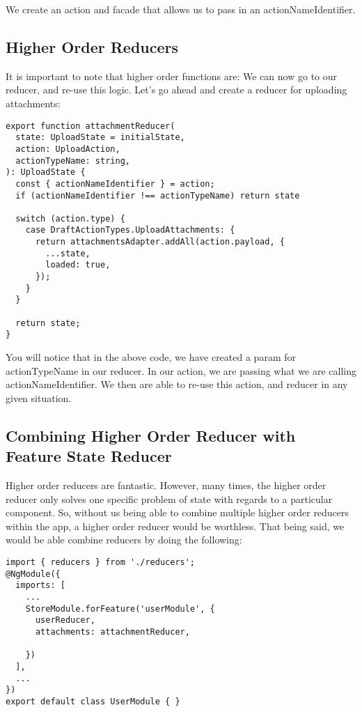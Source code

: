 We create an action and facade that allows us to pass in an
actionNameIdentifier.

\subsection{Higher Order Reducers}

It is important to note that higher order functions are:
We can now go to our reducer, and re-use this logic. Let's
go ahead and create a reducer for uploading attachments:

\begin{lstlisting}
export function attachmentReducer(
  state: UploadState = initialState,
  action: UploadAction,
  actionTypeName: string,
): UploadState {
  const { actionNameIdentifier } = action;
  if (actionNameIdentifier !== actionTypeName) return state

  switch (action.type) {
    case DraftActionTypes.UploadAttachments: {
      return attachmentsAdapter.addAll(action.payload, {
        ...state,
        loaded: true,
      });
    }
  }

  return state;
}
\end{lstlisting}

You will notice that in the above code, we have created a param for
actionTypeName in our reducer. In our action, we are passing what we are calling
actionNameIdentifier. We then are able to re-use this action, and reducer in any
given situation.

\subsection{Combining Higher Order Reducer with Feature State Reducer }

Higher order reducers are fantastic. However, many times, the higher order
reducer only solves one specific problem of state with regards to a particular
component. So, without us being able to combine multiple higher order reducers
within the app, a higher order reducer would be worthless. That being said, we
would be able combine reducers by doing the following:

\begin{lstlisting}
import { reducers } from './reducers';
@NgModule({
  imports: [
    ...
    StoreModule.forFeature('userModule', {
      userReducer,
      attachments: attachmentReducer,

    })
  ],
  ...
})
export default class UserModule { }
\end{lstlisting}

